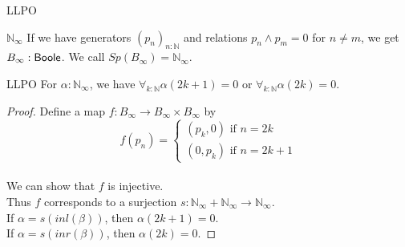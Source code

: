 \begin{frame}{LLPO}
  \begin{exampleblock}{$\mathbb N_\infty$}
    If we have generators $(p_n)_{n:\mathbb N}$ 
    and relations $p_n \wedge p_m = 0$ for 
    $n \neq m$, we get $B_\infty:\mathsf{Boole}$.
    We call $Sp(B_\infty) = \mathbb N_\infty$. 
  \end{exampleblock}
  \begin{block}{LLPO}
    For $\alpha:\mathbb N_\infty$, 
    we have 
    $\forall_{k:\mathbb N} \alpha(2k+1) = 0 $ or 
    $\forall_{k:\mathbb N} \alpha(2k) = 0$.
  \end{block}
  \pause 
  \begin{proof}
    Define a map $f:B_\infty \to B_\infty \times B_\infty $ by 
    \pause 
    \vspace{-0.2cm}
    $$
      f(p_n) = \begin{cases}
        (p_k,0) \text{ if } n = 2k \\
        (0,p_k) \text{ if } n = 2k+1
      \end{cases}
    $$
    \vspace{-0.5 cm}
    \\
    \pause
    We can show that $f$ is injective. 
    \pause \\
    Thus $f$ corresponds to a surjection 
    $s:\mathbb N_\infty +\mathbb N_\infty \to \mathbb N_\infty$. \\
    \pause 
    If $\alpha=s(inl(\beta))$, then $\alpha(2k+1) = 0$. \\
    \pause
    If $\alpha=s(inr(\beta))$, then $\alpha(2k) = 0$. 
  \end{proof}
\end{frame}
